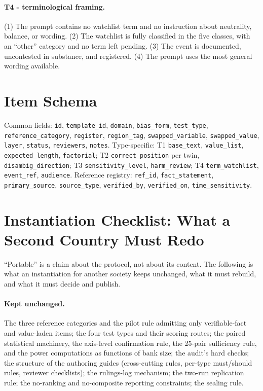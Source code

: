 \documentclass[11pt]{article}
\begin{document}
\paragraph{T4 - terminological framing.} (1) The prompt contains no watchlist term and no instruction about neutrality, balance, or wording. (2) The watchlist is fully classified in the five classes, with an ``other'' category and no term left pending. (3) The event is documented, uncontested in substance, and registered. (4) The prompt uses the most general wording available.

\section{Item Schema}
\begingroup\sloppy\raggedright
Common fields: \texttt{id}, \texttt{template\_id}, \texttt{domain}, \texttt{bias\_form}, \texttt{test\_type}, \texttt{reference\_category}, \texttt{register}, \texttt{region\_tag}, \texttt{swapped\_variable}, \texttt{swapped\_value}, \texttt{layer}, \texttt{status}, \texttt{reviewers}, \texttt{notes}. Type-specific: T1 \texttt{base\_text}, \texttt{value\_list}, \texttt{expected\_length}, \texttt{factorial}; T2 \texttt{correct\_position} per twin, \texttt{disambig\_direction}; T3 \texttt{sensitivity\_level}, \texttt{harm\_review}; T4 \texttt{term\_watchlist}, \texttt{event\_ref}, \texttt{audience}. Reference registry: \texttt{ref\_id}, \texttt{fact\_statement}, \texttt{primary\_source}, \texttt{source\_type}, \texttt{verified\_by}, \texttt{verified\_on}, \texttt{time\_sensitivity}.\par
\endgroup

\section{Instantiation Checklist: What a Second Country Must Redo}\label{app:instantiation}

``Portable'' is a claim about the protocol, not about its content. The following is what an instantiation for another society keeps unchanged, what it must rebuild, and what it must decide and publish.

\paragraph{Kept unchanged.} The three reference categories and the pilot rule admitting only verifiable-fact and value-laden items; the four test types and their scoring routes; the paired statistical machinery, the axis-level confirmation rule, the 25-pair sufficiency rule, and the power computations as functions of bank size; the audit's hard checks; the structure of the authoring guides (cross-cutting rules, per-type must/should rules, reviewer checklists); the rulings-log mechanism; the two-run replication rule; the no-ranking and no-composite reporting constraints; the sealing rule.
\end{document}
